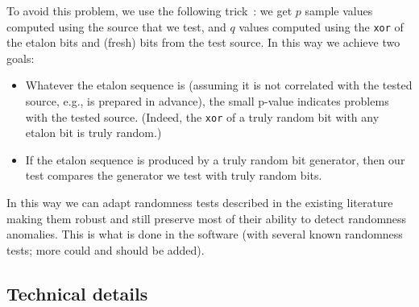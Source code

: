 \documentclass[12pt,a4paper,fullpage]{article}
\begin{document}
To avoid this problem, we use the following trick~\cite{shen-robust}: we get $p$ sample values computed using the source that we test, and $q$ values computed using the \texttt{xor} of the etalon bits and (fresh) bits from the test source. In this way we achieve two goals:
\begin{itemize}
\item Whatever the etalon sequence is (assuming it is not correlated with the tested source, e.g., is prepared in advance), the small p-value indicates problems with the tested source. (Indeed,  the \texttt{xor} of a truly random bit with any etalon bit is truly random.)
\item If the etalon sequence is produced by a truly random bit generator, then our test compares the generator we test with truly random bits.
\end{itemize} 
In this way we can adapt randomness tests described in the existing literature making them robust and still preserve most of their ability to detect randomness anomalies. This is what is done in the software (with several known randomness tests; more could and should be added).

\subsection{Technical details}
\end{document}
